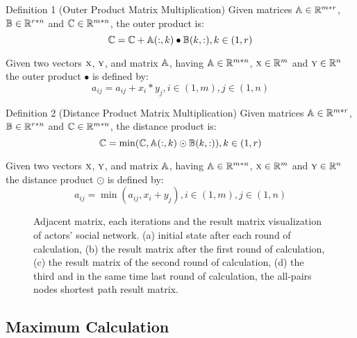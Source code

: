 \documentclass[review]{cvpr}
\begin{document}
Definition 1 (Outer Product Matrix Multiplication) Given matrices \(\Bbb A \in \Bbb R^{m*r}\), \(\Bbb B \in \Bbb R^{r*n}\) and \(\Bbb C \in \Bbb R^{m*n}\), the outer product is:
\begin{equation}
\Bbb C = \Bbb C  + \Bbb A(:,k)\bullet \Bbb B(k,:) , k \in (1,r)
\end{equation}

Given two vectors \(\textsc x\), \(\textsc y\), and matrix \(\Bbb A\), having \(\Bbb A \in \Bbb R^{m*n}\), \(\textsc x \in \Bbb R^{m}\) and \(\textsc y \in \Bbb R^{n}\) the outer product \(\bullet\) is defined by:
\begin{equation}
a_{ij} = a_{ij} + x_i * y_j, i \in (1,m), j \in (1,n)
\end{equation}

Definition 2 (Distance Product Matrix Multiplication) Given matrices \(\Bbb A \in \Bbb R^{m*r}\), \(\Bbb B \in \Bbb R^{r*n}\) and \(\Bbb C \in \Bbb R^{m*n}\), the distance product is:
\begin{equation}
  \Bbb C = \min(\Bbb C, \Bbb A(:,k)\odot \Bbb B(k,:)) , k \in (1,r)
\end{equation}

Given two vectors \(\textsc x\), \(\textsc y\), and matrix \(\Bbb A\), having \(\Bbb A \in \Bbb R^{m*n}\), \(\textsc x \in \Bbb R^{m}\) and \(\textsc y \in \Bbb R^{n}\) the distance product \(\odot\) is defined by:
\begin{equation}
a_{ij} = \min(a_{ij} , x_i + y_j), i \in (1,m), j \in (1,n)
\end{equation}
\begin{figure*}
\begin{center}
\end{center}
   \caption{Adjacent matrix, each iterations and the result matrix visualization of actors' social network. (a) initial state after each round of calculation, (b) the result matrix after the first round of calculation, (c) the result matrix of the second round of calculation, (d) the third and in the same time last round of calculation, the all-pairs nodes shortest path result matrix.}
\label{fig:short}
\end{figure*}


\subsection{Maximum Calculation}
\end{document}
